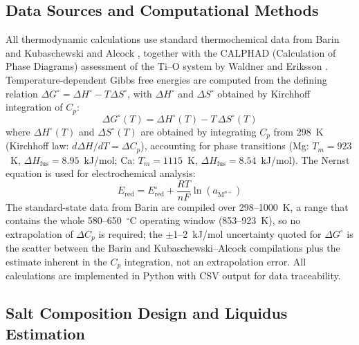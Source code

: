 \documentclass[pdflatex,sn-basic,Numbered]{sn-jnl}
\begin{document}
\subsection{Data Sources and Computational Methods}
\label{subsec:data}

All thermodynamic calculations use standard thermochemical data from Barin \cite{barin1995} and Kubaschewski and Alcock \cite{kubaschewski1979}, together with the CALPHAD (Calculation of Phase Diagrams) assessment of the Ti--O system by Waldner and Eriksson \cite{waldner1999}. Temperature-dependent Gibbs free energies are computed from the defining relation $\Delta G^{\circ} = \Delta H^{\circ} - T\Delta S^{\circ}$, with $\Delta H^{\circ}$ and $\Delta S^{\circ}$ obtained by Kirchhoff integration of $C_p$:
\begin{equation}
\label{eq:gibbs}
\Delta G^{\circ}(T) = \Delta H^{\circ}(T) - T\,\Delta S^{\circ}(T)
\end{equation}
where $\Delta H^{\circ}(T)$ and $\Delta S^{\circ}(T)$ are obtained by integrating $C_p$ from 298~K (Kirchhoff law: $d\Delta H/dT = \Delta C_p$), accounting for phase transitions (Mg: $T_m=923$~K, $\Delta H_{\mathrm{fus}}=8.95$~kJ/mol; Ca: $T_m=1115$~K, $\Delta H_{\mathrm{fus}}=8.54$~kJ/mol). The Nernst equation is used for electrochemical analysis:
\begin{equation}
\label{eq:nernst}
E_{\mathrm{red}} = E^{\circ}_{\mathrm{red}} + \frac{RT}{nF}\ln(a_{\mathrm{M}^{n+}})
\end{equation}
The standard-state data from Barin \cite{barin1995} are compiled over 298--1000~K, a range that contains the whole 580--650~$^{\circ}$C operating window (853--923~K), so no extrapolation of $\Delta C_p$ is required; the $\pm$1--2~kJ/mol uncertainty quoted for $\Delta G^{\circ}$ is the scatter between the Barin and Kubaschewski--Alcock compilations plus the estimate inherent in the $C_p$ integration, not an extrapolation error. All calculations are implemented in Python with CSV output for data traceability.

\subsection{Salt Composition Design and Liquidus Estimation}
\end{document}
